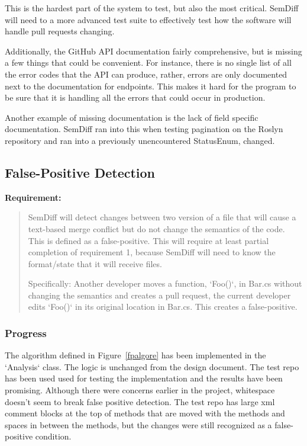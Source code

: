 \documentclass[draftclsnofoot,onecolumn]{IEEEtran}
\begin{document}
This is the hardest part of the system to test, but also the most critical. 
SemDiff will need to a more advanced test suite to effectively test how the 
software will handle pull requests changing.

Additionally, the GitHub API documentation fairly comprehensive, but is missing 
a few things that could be convenient. For instance, there is no single list of 
all the error codes that the API can produce, rather, errors are only 
documented next to the documentation for endpoints. This makes it hard for the 
program to be sure that it is handling all the errors that could occur in 
production.

Another example of missing documentation is the lack of field specific 
documentation. SemDiff ran into this when testing pagination on the Roslyn 
repository and ran into a previously unencountered StatusEnum, changed. 

\subsection{False-Positive Detection}%

\textbf{Requirement:}

\begin{quote}

SemDiff will detect changes between two version of a file that will cause a 
text-based merge conflict but do not change the semantics of the code. This is 
defined as a false-positive. This will require at least partial completion of 
requirement 1, because SemDiff will need to know the format/state that it will 
receive files.

Specifically: Another developer moves a function, `Foo()`, in Bar.cs without 
changing the semantics and creates a pull request, the current developer edits 
`Foo()` in its original location in Bar.cs. This creates a false-positive.

\end{quote}

\subsubsection{Progress}

The algorithm defined in Figure~\ref{fpalgore} has been implemented in the 
`Analysis` class. The logic is unchanged from the design document. The test 
repo has been used used for testing the implementation and the results have 
been promising. Although there were concerns earlier in the project, whitespace 
doesn’t seem to break false positive detection. The test repo has large xml 
comment blocks at the top of methods that are moved with the methods and spaces 
in between the methods, but the changes were still recognized as a 
false-positive condition.
\end{document}
